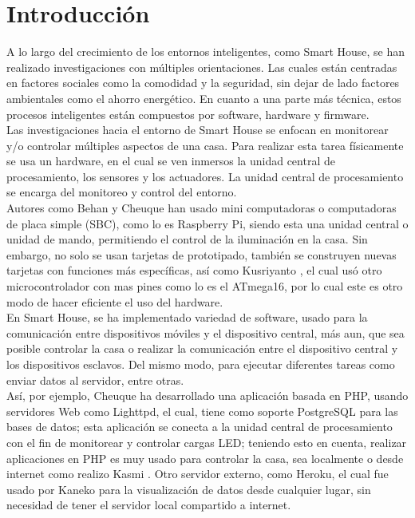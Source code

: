 \chapter{Introducción}


A lo largo del crecimiento de los entornos inteligentes, como Smart House, se han realizado investigaciones con múltiples orientaciones. Las cuales están centradas en factores sociales como la comodidad y la seguridad, sin dejar de lado factores ambientales como el ahorro energético. En cuanto a una parte más técnica, estos procesos inteligentes están compuestos por software, hardware y firmware.\\

Las investigaciones hacia el entorno de Smart House se enfocan en monitorear y/o controlar múltiples aspectos de una casa. Para realizar esta tarea físicamente se usa un hardware, en el cual se ven inmersos la unidad central de procesamiento, los sensores y los actuadores. La unidad central de procesamiento se encarga del monitoreo y control del entorno.\\

Autores como Behan \cite{Behan2013} y Cheuque \cite{Cheuque2015} han usado mini computadoras o computadoras de placa simple (SBC), como lo es Raspberry Pi,  siendo esta una unidad central o unidad de mando, permitiendo el control de la iluminación en la casa. Sin embargo, no solo se usan tarjetas de prototipado, también se construyen nuevas tarjetas con funciones más específicas, así como Kusriyanto \cite{Kusriyanto2015}, el cual usó otro microcontrolador con mas pines como lo es el ATmega16, por lo cual este es otro modo de hacer eficiente el uso del hardware.\\

En Smart House, se ha implementado variedad de software, usado para la comunicación entre dispositivos móviles y el dispositivo central, más aun, que sea posible controlar la casa o realizar la comunicación entre el dispositivo central y los dispositivos esclavos. Del mismo modo, para ejecutar diferentes tareas como enviar datos al servidor, entre otras.\\

Así, por ejemplo, Cheuque \cite{Cheuque2015} ha desarrollado una aplicación basada en PHP, usando servidores Web como Lighttpd, el cual, tiene como soporte PostgreSQL para las bases de datos; esta aplicación se conecta a la unidad central de procesamiento con el fin de monitorear y controlar cargas LED; teniendo esto en cuenta, realizar aplicaciones en PHP es muy usado para controlar la casa, sea localmente o desde internet como realizo Kasmi \cite{Kasmi2016}. Otro servidor externo, como Heroku, el cual fue usado por Kaneko \cite{Kaneko2017} para la visualización de datos desde cualquier lugar, sin necesidad de tener el servidor local compartido a internet.\\

